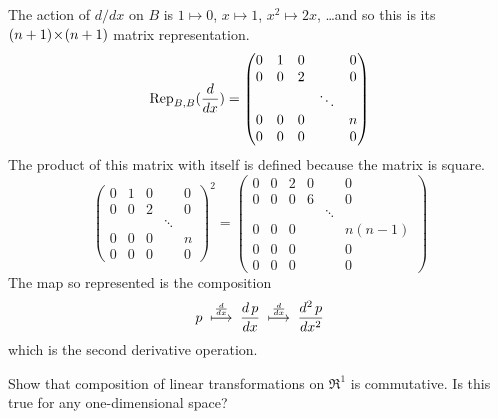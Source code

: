 \begin{exercises}
\begin{answer}
      The action of $d/dx$ on $B$ is 
      $1\mapsto0$, $x\mapsto 1$, $x^2\mapsto 2x$, \ldots and so 
      this is its $\nbyn{(n+1)}$ matrix representation.
      \begin{equation*}
        \rep{\frac{d}{dx}}{B,B}=
        \begin{pmatrix}
          0  &1 &0  &  &0  \\
          0  &0 &2  &  &0  \\
             &  &   &\ddots\\
          0  &0 &0  &  &n  \\
          0  &0 &0  &  &0
        \end{pmatrix}
      \end{equation*}
      The product of this matrix with itself is defined because the matrix is
      square.
      \begin{equation*}
        \begin{pmatrix}
          0  &1 &0  &  &0  \\
          0  &0 &2  &  &0  \\
             &  &   &\ddots\\
          0  &0 &0  &  &n  \\
          0  &0 &0  &  &0
        \end{pmatrix}^2
        =
        \begin{pmatrix}
          0  &0 &2  &0  &        &0       \\
          0  &0 &0  &6  &        &0       \\
             &  &   &   &\ddots  &        \\
          0  &0 &0  &  &         &n(n-1)  \\
          0  &0 &0  &  &         &0       \\
          0  &0 &0  &  &         &0
        \end{pmatrix}
      \end{equation*}
      The map so represented is the composition
      \begin{equation*}
        p\;\mapsunder{\frac{d}{dx}}\;\frac{d\,p}{dx}
         \;\mapsunder{\frac{d}{dx}}\;\frac{d^2\,p}{dx^2}
      \end{equation*}
      which is the second derivative operation.  
     \end{answer}
  \item  
    Show that composition of linear transformations on \( \Re^1 \) is
    commutative.
    Is this true for any one-dimensional space?
    \begin{answer}

\end{answer}
\end{exercises}

